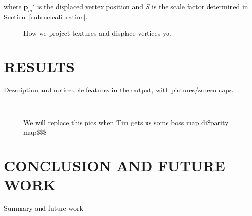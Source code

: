\documentclass[a4paper,twoside]{article}
\begin{document}
where $\mathbf{p}_{m}'$ is the displaced vertex position and $S$ is the scale factor determined in Section~\ref{subsec:calibration}. 
\begin{figure*}[!ht]
   \vspace{-0.2cm}
   \caption{How we project textures and displace vertices yo.}
  \label{fig:projtex}
 \end{figure*}

\section{\uppercase{Results}}
\label{sec:results}

\noindent Description and noticeable features in the output, with pictures/screen caps. 

\begin{figure}[!h]
	\centering
		\quad %
		\\%
		\medskip
		\caption{We will replace this pics when Tim gets us some boss map di\$parity map\$\$\$}
		\label{disparity}
\end{figure}

\section{\uppercase{Conclusion and Future Work}}
\label{sec:conclusion}

\noindent Summary and future work.


{\small
}
\end{document}
